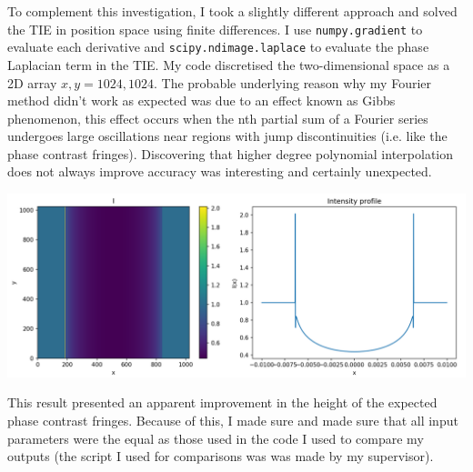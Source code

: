 \documentclass[9pt, a4paper]{article}
\newenvironment{Figure}
    {\par\medskip\noindent\minipage{\linewidth}}
    {\endminipage\par\medskip}
\begin{document}
To complement this investigation, I took a slightly different approach and solved the TIE in position space using finite differences. I use \texttt{numpy.gradient} to evaluate each derivative and \texttt{scipy.ndimage.laplace} to evaluate the phase Laplacian term in the TIE. My code discretised the two-dimensional space as a 2D array $x, y = 1024, 1024$. 
The probable underlying reason why my Fourier method didn't work as expected was due to an effect known as Gibbs phenomenon, this effect occurs when the nth partial sum of a Fourier series undergoes large oscillations near regions with jump discontinuities\cite{Gibbs} (i.e. like the phase contrast fringes). Discovering that higher degree polynomial interpolation does not always improve accuracy was interesting and certainly unexpected.
\begin{Figure}\label{fig:2}  
\centering
\includegraphics[width=\linewidth]{FD_intensity_profile.pdf}
\end{Figure}
This result presented an apparent improvement in the height of the expected phase contrast fringes. Because of this, I made sure  and made sure that all input parameters were the equal as those used in the code I used to compare my outputs (the script I used for comparisons was was made by my supervisor).
\end{document}
